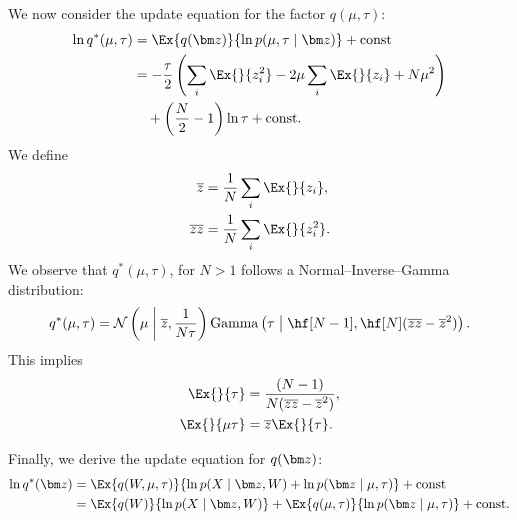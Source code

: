 We now consider the update equation for the factor $q(\mu, \tau)$:
\begin{align*}
    \ln q^*(\mu, \tau)
    &= \Ex{q(\vect{z})}{ \ln p(\mu, \tau \mid \vect{z}) } + \text{const} \\
    &= - \frac{\tau}{2} \left(\sum_{i} \Ex{}{z_i^2} - 2\mu \sum_{i} \Ex{}{z_i} + N\mu^2 \right) \\
    &\quad + \left(\frac{N}{2}-1\right)\ln\tau  + \text{const}.
\end{align*}
We define
\begin{align*}
    \avgz &= \frac{1}{N} \sum_i \Ex{}{z_i}, \\
    \avgzz &= \frac{1}{N} \sum_i \Ex{}{z_i^2}.
\end{align*}
We observe that $q^*(\mu, \tau)$, for $N > 1$ follows a Normal–Inverse–Gamma distribution:
\begin{equation*}
    q^*(\mu, \tau) = \Nor{\mu}{\avgz}{\frac{1}{N \tau}} \Gam{\tau}{\hf[N-1]}{\hf[N](\avgzz - \avgz^{2})}.
\end{equation*}
This implies
\begin{align*}
    \Ex{}{\tau} &= \frac{(N - 1)}{N(\avgzz - \avgz^{2})}, \\
    \Ex{}{\mu \tau} &= \avgz \Ex{}{\tau}.
\end{align*}

Finally, we derive the update equation for $q(\vect{z})$:
\begin{align*}
    \ln q^*(\vect{z}) &= \Ex{q(W,\mu,\tau)}{\ln p(X \mid \vect{z}, W) +
    \ln p(\vect{z} \mid \mu, \tau)} + \text{const} \\
    &= \Ex{q(W)}{\ln p(X \mid \vect{z}, W)} +
    \Ex{q(\mu,\tau)}{\ln p(\vect{z} \mid \mu, \tau)} + \text{const}.
\end{align*}

